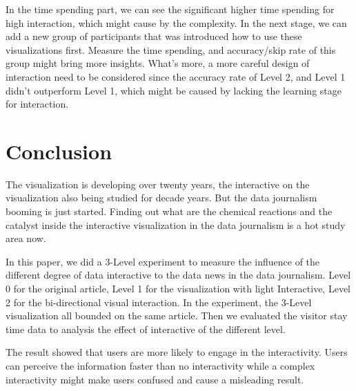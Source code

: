 \documentclass[9pt,journal,compsoc]{IEEEtran}
\begin{document}
In the time spending part, we can see the significant higher time spending for high interaction, which might cause by the complexity. In the next stage, we can add a new group of participants that was introduced how to use these visualizations first. Measure the time spending, and accuracy/skip rate of this group might bring more insights. What's more, a more careful design of interaction need to be considered since the accuracy rate of Level 2, and Level 1 didn't outperform Level 1, which might be caused by lacking the learning stage for interaction.

\section{Conclusion}
\large
The visualization is developing over twenty years, the interactive on the visualization also being studied for decade years. But the data journalism booming is just started. Finding out what are the chemical reactions and the catalyst inside the interactive visualization in the data journalism is a hot study area now.

In this paper, we did a 3-Level experiment to measure the influence of the different degree of data interactive to the data news in the data journalism.  Level 0 for the original article, Level 1 for the visualization with light Interactive, Level 2 for the bi-directional visual interaction. In the experiment, the 3-Level visualization all bounded on the same article. Then we evaluated the visitor stay time data to analysis the effect of interactive of the different level.

The result showed that users are more likely to engage in the interactivity. Users can perceive the information faster than no interactivity while a complex interactivity might make users confused and cause a misleading result.
\end{document}

